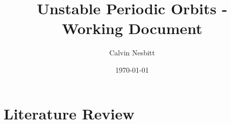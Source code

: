 \documentclass[11pt,a4,oneside]{article}
\title{Unstable Periodic Orbits - Working Document}
\date{\today}
\author{Calvin Nesbitt}
\begin{document}
\maketitle


\tableofcontents
\newpage
{}

\newcommand{\patha}{tex/Literature-Review}
\section{Literature Review}





\clearpage

 \newcommand{\bibLocation}{/Users/cfn18/Documents/PhD-Work/PhD-Latex-Repository/BibTex-Files} %
\end{document}
